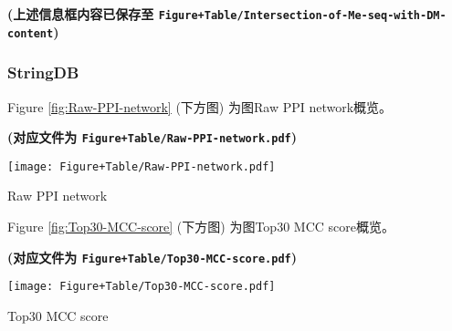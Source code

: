 \documentclass[
]{article}
\begin{document}
\textbf{(上述信息框内容已保存至 \texttt{Figure+Table/Intersection-of-Me-seq-with-DM-content})}

\hypertarget{stringdb}{%
\subsubsection{StringDB}\label{stringdb}}

\begin{center}\vspace{1.5cm}\end{center}

Figure \ref{fig:Raw-PPI-network} (下方图) 为图Raw PPI network概览。

\textbf{(对应文件为 \texttt{Figure+Table/Raw-PPI-network.pdf})}

\def\@captype{figure}
\begin{center}
\texttt{[image: Figure+Table/Raw-PPI-network.pdf]}
\caption{Raw PPI network}\label{fig:Raw-PPI-network}
\end{center}

\begin{center}\vspace{1.5cm}\end{center}

\begin{center}\vspace{1.5cm}\end{center}

Figure \ref{fig:Top30-MCC-score} (下方图) 为图Top30 MCC score概览。

\textbf{(对应文件为 \texttt{Figure+Table/Top30-MCC-score.pdf})}

\def\@captype{figure}
\begin{center}
\texttt{[image: Figure+Table/Top30-MCC-score.pdf]}
\caption{Top30 MCC score}\label{fig:Top30-MCC-score}
\end{center}

\begin{center}\vspace{1.5cm}\end{center}

\begin{center}\vspace{1.5cm}\end{center}
\end{document}

